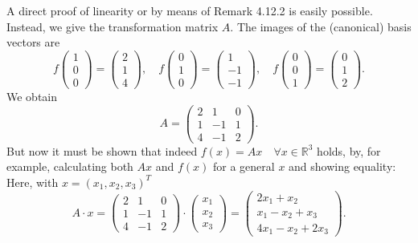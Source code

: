 A direct proof of linearity or by means of Remark 4.12.2 is easily possible. Instead, we give the transformation matrix \(A\). The images of the (canonical) basis vectors are
\[
f\begin{pmatrix}
1 \\
0 \\
0
\end{pmatrix} =
\begin{pmatrix}
2 \\
1 \\
4
\end{pmatrix} , \quad
f\begin{pmatrix}
0 \\
1 \\
0
\end{pmatrix} =
\begin{pmatrix}
1 \\
-1 \\
-1
\end{pmatrix} , \quad
f\begin{pmatrix}
0 \\
0 \\
1
\end{pmatrix} =
\begin{pmatrix}
0 \\
1 \\
2
\end{pmatrix} .
\]
We obtain
\[
A =
\begin{pmatrix}
2 & 1 & 0 \\
1 & -1 & 1 \\
4 & -1 & 2
\end{pmatrix} .
\]
But now it must be shown that indeed \(f(x) = Ax \quad \forall x \in \mathbb{R}^3\) holds, by, 
for example, calculating both \(Ax\) and \(f(x)\) for a 
general \(x\) and showing equality: Here, with \(x = (x_1, x_2, x_3)^T\)
\[
A \cdot x =
\begin{pmatrix}
2 & 1 & 0 \\
1 & -1 & 1 \\
4 & -1 & 2
\end{pmatrix}
\cdot
\begin{pmatrix}
x_1 \\
x_2 \\
x_3
\end{pmatrix} =
\begin{pmatrix}
2x_1 + x_2 \\
x_1 - x_2 + x_3 \\
4x_1 - x_2 + 2x_3
\end{pmatrix} .
\]
